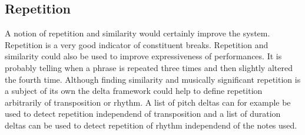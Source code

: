 \documentclass[a4paper,10pt]{article}
\begin{document}
\subsection{Repetition}
A notion of repetition and similarity would certainly improve the system. Repetition is a very good indicator of constituent breaks. Repetition and similarity could also be used to improve expressiveness of performances. It is probably telling when a phrase is repeated three times and then slightly altered the fourth time. Although finding similarity and musically significant repetition is a subject of its own the delta framework could help to define repetition arbitrarily of transposition or rhythm. A list of pitch deltas can for example be used to detect repetition independend of transposition and a list of duration deltas can be used to detect repetition of rhythm independend of the notes used. 

  
 
 
\end{document}
